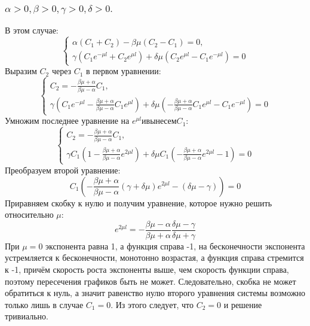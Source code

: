 \documentclass[12pt, a4paper]{report}
\begin{document}
\subsubsection{ $ \alpha > 0, \beta > 0, \gamma > 0, \delta > 0. $}
В этом случае:
\begin{displaymath}
	\begin{cases}
		\alpha (C_{1} + C_{2}) - \beta \mu (C_{2} - C_{1}) = 0, \\
		\gamma (C_{1} e^{-\mu l} + C_{2} e^{\mu l}) + \delta \mu (C_{2} e^{\mu l} - C_{1} e^{-\mu l}) = 0
	\end{cases}
\end{displaymath}
Выразим $C_{2}$ через $C_{1}$ в первом уравнении:
\begin{displaymath}
	\begin{cases}
		C_{2} = -\frac{\beta \mu + \alpha}{\beta \mu - \alpha} C_{1}, \\
		\gamma (C_{1} e^{-\mu l} -\frac{\beta \mu + \alpha}{\beta \mu - \alpha} C_{1} e^{\mu l}) + \delta \mu (-\frac{\beta \mu + \alpha}{\beta \mu - \alpha} C_{1} e^{\mu l} - C_{1} e^{-\mu l}) = 0
	\end{cases}
\end{displaymath}
Умножим последнее уравнение на $e^{\mu l} и вынесем C_{1}$:
\begin{displaymath}
	\begin{cases}
		C_{2} = -\frac{\beta \mu + \alpha}{\beta \mu - \alpha} C_{1}, \\
		\gamma C_{1}(1 -\frac{\beta \mu + \alpha}{\beta \mu - \alpha} e^{2 \mu l}) + \delta \mu C_{1} (-\frac{\beta \mu + \alpha}{\beta \mu - \alpha} e^{2\mu l} - 1) = 0
	\end{cases}
\end{displaymath}
Преобразуем второй уравнение:
\[ C_{1} ( -\frac{\beta \mu + \alpha}{\beta \mu - \alpha} (\gamma + \delta \mu ) e^{2 \mu l} - (\delta \mu - \gamma)) = 0 \]
Приравняем скобку к нулю и получим уравнение, которое нужно решить относительно $\mu$:
\[ e^{2\mu l} = - \frac{\beta \mu - \alpha}{\beta \mu + \alpha} \frac{\delta \mu - \gamma}{\delta \mu + \gamma}\]
При $\mu = 0$ экспонента равна 1, а функция справа -1, на бесконечности экспонента устремляется к бесконечности, монотонно возрастая, а функция справа стремится к -1, причём скорость роста экспоненты выше, чем скорость функции справа, поэтому пересечения графиков быть не может. Следовательно, скобка не может обратиться к нуль, а значит равенство нулю второго уравнения системы возможно только лишь в случае $C_{1} = 0$. Из этого следует, что $C_{2} = 0$ и решение тривиально.
\end{document}
